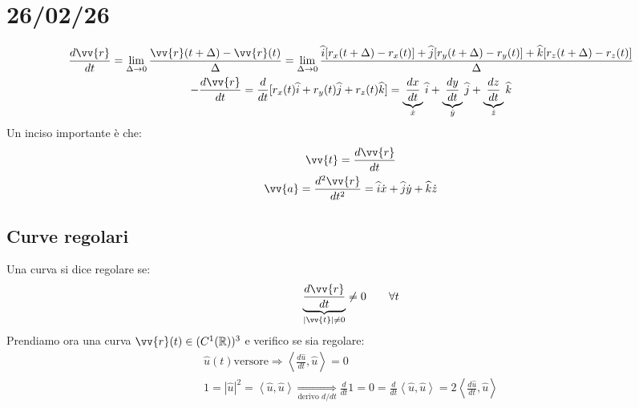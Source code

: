 \documentclass[a4paper, oneside]{article}
\begin{document}
    \section{26/02/26}
    \begin{center}
    \end{center}
    \begin{gather*}
        \frac{d\vv{r}}{dt} = \lim_{\Delta \to 0} \frac{\vv{r}(t + \Delta) - \vv{r}(t)}{\Delta} = \lim_{\Delta \to 0} \frac{\widehat{i}[r_x(t + \Delta) - r_x(t)] + \widehat{j}[r_y(t + \Delta) - r_y(t)] + \widehat{k}[r_z(t + \Delta) - r_z(t)]}{\Delta}\\
        -\frac{d \vv{r}}{dt} = \frac{d}{dt} [r_x(t) \widehat{i} + r_y(t) \widehat{j} + r_z(t) \widehat{k}] = \underbrace{\frac{dx}{dt}}_{\dot{x}} \widehat{i} + \underbrace{\frac{dy}{dt}}_{\dot{y}} \widehat{j} + \underbrace{\frac{dz}{dt}}_{\dot{z}} \widehat{k}
    \end{gather*}
    Un inciso importante è che:
    \begin{gather*}
        \vv{t} = \frac{d\vv{r}}{dt}\\
        \vv{a} = \frac{d^2 \vv{r}}{dt^2} = \widehat{i} \dot{x} + \widehat{j} \dot{y} + \widehat{k} \dot{z}
    \end{gather*}
    \subsection{Curve regolari}
    Una curva si dice regolare se:
    \begin{gather*}
        \underbrace{\frac{d\vv{r}}{dt}}_{|\vv{t}| \neq 0} \neq 0 \qquad \forall t
    \end{gather*}
    Prendiamo ora una curva $\vv{r}(t) \in (C^1 (\mathbb{R}))^3$ e verifico se sia regolare:
    \begin{gather*}
        \widehat{u}(t) \text{versore} \Rightarrow \left\langle \frac{d \widehat{u}}{dt} , \widehat{u} \right\rangle = 0\\
        1 = |\widehat{u}|^2 = \left\langle \widehat{u} , \widehat{u} \right\rangle \underset{\text{derivo $d/dt$}}{\Rightarrow} \frac{d}{dt} 1 = 0 = \frac{d}{dt} \left\langle \widehat{u} , \widehat{u} \right\rangle = 2 \left\langle \frac{d\widehat{u}}{dt} , \widehat{u} \right\rangle
    \end{gather*}
\end{document}
